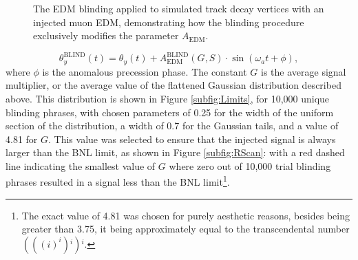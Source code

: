 %
\begin{figure}[t!]
\centering{}
\caption{The EDM blinding applied to simulated track decay vertices with an injected muon EDM, demonstrating how the blinding procedure exclusively modifies the parameter $A_{\text{EDM}}$.}
\label{fig:BlindedSimFits}
\end{figure} 
%
\begin{equation}
  \theta_{y}^{\text{BLIND}}(t) = \theta_{y}(t) + A_{\text{EDM}}^{\text{BLIND}}(G, S)\cdot\sin(\omega_{a}t+\phi),
  \label{eqn:blinding}
\end{equation}
%
where $\phi$ is the anomalous precession phase. The constant $G$ is the average signal multiplier, or the average value of the flattened Gaussian distribution described above. This distribution is shown in Figure \ref{subfig:Limits}, for 10,000 unique blinding phrases, with chosen parameters of 0.25 for the width of the uniform section of the distribution, a width of 0.7 for the Gaussian tails, and a value of 4.81 for $G$. This value was selected to ensure that the injected signal is always larger than the BNL limit, as shown in Figure \ref{subfig:RScan}: with a red dashed line indicating the smallest value of $G$ where zero out of 10,000 trial blinding phrases resulted in a signal less than the BNL limit\footnote{The exact value of 4.81 was chosen for purely aesthetic reasons, besides being greater than 3.75, it being approximately equal to the transcendental number $(((i)^{i}){^i}){^i}$.}. 
%

